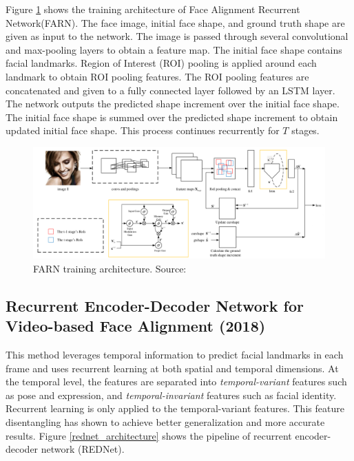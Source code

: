 \documentclass{llncs}
\begin{document}
Figure \ref{farn_training} shows the training architecture of Face Alignment Recurrent Network(FARN). The face image, initial face shape, and ground truth shape are given as input to the network. The image is passed through several convolutional and max-pooling layers to obtain a feature map. The initial face shape contains facial landmarks. Region of Interest (ROI) pooling is applied around each landmark to obtain ROI pooling features. The ROI pooling features are concatenated and given to a fully connected layer followed by an LSTM layer. The network outputs the predicted shape increment over the initial face shape. The initial face shape is summed over the predicted shape increment to obtain updated initial face shape. This process continues recurrently for $T$ stages.

\begin{figure}
	\centering
	\vspace{-5mm}
	\includegraphics[scale=0.3]{Media/farn_training2}
	\caption{FARN training architecture. Source:\cite{farn}}
	\label{farn_training}
	\vspace{-10mm}
\end{figure}
\vspace{-1mm}
	\subsection{Recurrent Encoder-Decoder Network for Video-based Face Alignment (2018) \cite{rednet}}
	This method leverages temporal information to predict facial landmarks in each frame and uses recurrent learning at both spatial and temporal dimensions. At the temporal level, the features are separated into \textit{temporal-variant} features such as pose and expression, and \textit{temporal-invariant} features such as facial identity. Recurrent learning is only applied to the temporal-variant features. This feature disentangling has shown to achieve better generalization and more accurate results. Figure \ref{rednet_architecture} shows the pipeline of recurrent encoder-decoder network (REDNet).
	
\end{document}
